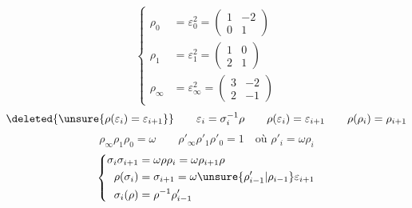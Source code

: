 \margin{\[
\left\{\begin{aligned}
N_0&=\begin{pmatrix}0&-1\\0&0\end{pmatrix}\\
N_1&=\begin{pmatrix}0&0\\1&0\end{pmatrix}\\
N_\infty&=\begin{pmatrix}1&-1\\1&-1\end{pmatrix}
\end{aligned}\right.
\]}
\[
\left\{\begin{aligned}
\rho_0&=\varepsilon_0^2=\begin{pmatrix}1&-2\\0&1\end{pmatrix}\\
\rho_1&=\varepsilon_1^2=\begin{pmatrix}1&0\\2&1\end{pmatrix}\\
\rho_\infty&=\varepsilon_\infty^2=\begin{pmatrix}3&-2\\2&-1\end{pmatrix}
\end{aligned}\right.
\]
\[
\deleted{\unsure{\rho(\varepsilon_i)=\varepsilon_{i+1}}}\qquad
\varepsilon_i=\sigma_i^{-1}\rho\qquad
\rho(\varepsilon_i)=\varepsilon_{i+1}\qquad\rho(\rho_i)=\rho_{i+1}
\]
\[
\rho_\infty\rho_1\rho_0=\omega\qquad
\rho'_\infty\rho'_1\rho'_0=1\quad\text{où }\rho'_i=\omega\rho_i
\]
\[
\left\{\begin{aligned}
\sigma_i\sigma_{i+1}&=\omega\rho\rho_i=\omega\rho_{i+1}\rho\\
\rho(\sigma_i)&=\sigma_{i+1}=\omega\unsure{\rho'_{i-1}|\rho_{i-1}}\varepsilon_{i+1}\\
\sigma_i(\rho)&=\rho^{-1}\rho'_{i-1}
\end{aligned}\right.
\]
